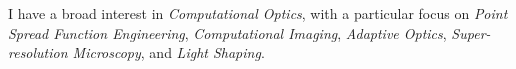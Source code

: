 I have a broad interest in \textit{Computational Optics}, with a particular focus on \textit{Point Spread Function Engineering}, \textit{Computational Imaging}, \textit{Adaptive Optics}, \textit{Super-resolution Microscopy}, and \textit{Light Shaping}.